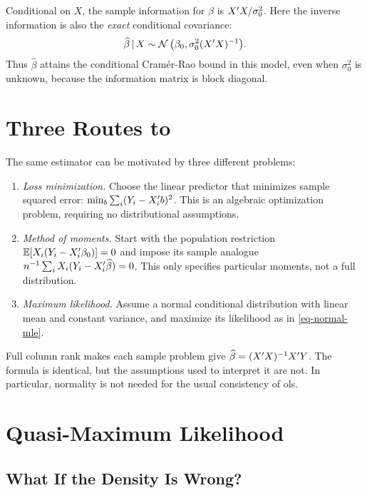 \documentclass[a4paper,12pt]{article}
\begin{document}
\begin{remark}
	Conditional on $X$, the sample information for $\beta$ is $X^{\prime} X/\sigma_0^2$.
	Here the inverse information is also the \emph{exact} conditional covariance:
	\begin{align}
		\widehat\beta\mathpunct{}|\mathpunct{} X
		\sim\operatorname{\mathcal{N}}\big(\beta_0,\sigma_0^2(X^{\prime} X)^{-1}\big).
	\end{align}
	Thus $\widehat\beta$ attains the conditional Cram\'er-Rao bound in this model,
	even when $\sigma_0^2$ is unknown, because the information matrix is block diagonal.
\end{remark}

\section{Three Routes to }

The same estimator can be motivated by three different problems:
\begin{enumerate}
	\item \emph{Loss minimization.}
	Choose the linear predictor that minimizes sample squared error:
	$\min_b\sum_i(Y_i-X_i^{\prime} b)^2$.
	This is an algebraic optimization problem, requiring no distributional assumptions.
	\item \emph{Method of moments.}
	Start with the population restriction $\operatorname{\mathbb{E}}[X_i(Y_i-X_i^{\prime}\beta_0)]=0$
	and impose its sample analogue $n^{-1}\sum_iX_i(Y_i-X_i^{\prime}\widehat\beta)=0$.
	This only specifies particular moments, not a full distribution.
	\item \emph{Maximum likelihood.}
	Assume a normal conditional distribution with linear mean and constant variance,
	and maximize its likelihood as in \eqref{eq-normal-mle}.
\end{enumerate}
Full column rank makes each sample problem give $\widehat\beta=(X^{\prime} X)^{-1} X^{\prime} Y$.
The formula is identical, but the assumptions used to interpret it are not.
In particular, normality is not needed for the usual consistency of \gls{ols}.

\section{Quasi-Maximum Likelihood}

\subsection{What If the Density Is Wrong?}
\end{document}
